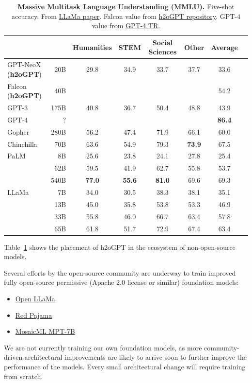 \documentclass{article}
\begin{document}
\begin{table}[t!]
    \center
    \begin{tabular}{lrcccccc}
        \toprule
         &  & Humanities & STEM & Social Sciences & Other & Average\\
        \midrule
        GPT-NeoX (\textbf{h2oGPT})   & 20B   & 29.8 & 34.9 & 33.7 & 37.7 & 33.6 \\
        Falcon (\textbf{h2oGPT}) & 40B & & & & &  54.2 \\
        GPT-3      & 175B  & 40.8 & 36.7 & 50.4 & 48.8 & 43.9 \\
        GPT-4      & ? & & & & & \textbf{86.4} \\
        Gopher     & 280B  & 56.2 & 47.4 & 71.9 & 66.1 & 60.0 \\
        Chinchilla & 70B   & 63.6 & 54.9 & 79.3 & \textbf{73.9} & 67.5\\
        \midrule
        {PaLM}
                   & 8B       & 25.6 & 23.8 & 24.1 & 27.8 & 25.4 \\
                   & 62B      & 59.5 & 41.9 & 62.7 & 55.8 & 53.7 \\
                   & 540B     & \textbf{77.0} & \textbf{55.6 }&\textbf{ 81.0} & 69.6 & 69.3\\
        \midrule
        {LLaMa}
                   & 7B & 34.0 & 30.5 & 38.3 & 38.1 & 35.1 \\
                   & 13B  & 45.0 & 35.8 & 53.8 & 53.3 & 46.9 \\
                   & 33B  & 55.8 & 46.0 & 66.7 & 63.4 & 57.8 \\
                   & 65B  & 61.8 & 51.7 & 72.9 & 67.4 & 63.4  \\
        \bottomrule
    \end{tabular}
    \caption{
    \textbf{Massive Multitask Language Understanding (MMLU).} Five-shot accuracy.
    From \href{https://arxiv.org/abs/2302.13971}{LLaMa paper}. Falcon value from \href{https://github.com/h2oai/h2ogpt/issues/251}{h2oGPT repository}. GPT-4 value from \href{https://arxiv.org/abs/2303.08774}{GPT-4 TR}.
    \label{tab:mmlu}
    }
\end{table}

Table~\ref{tab:mmlu} shows the placement of h2oGPT in the ecosystem of non-open-source models.

Several efforts by the open-source community are underway to train improved fully open-source permissive (Apache 2.0 license or similar) foundation models:

 \begin{itemize}
     \item \href{https://github.com/openlm-research/open_llama}{Open LLaMa}
     \item \href{https://www.together.xyz/blog/redpajama}{Red Pajama}
     \item \href{https://www.mosaicml.com/blog/mpt-7b}{MosaicML MPT-7B}
 \end{itemize}
We are not currently training our own foundation models, as more community-driven architectural improvements are likely to arrive soon to further improve the performance of the models. Every small architectural change will require training from scratch.
\end{document}
